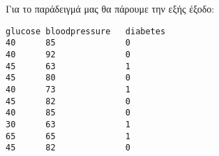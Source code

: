 Για το παράδειγμά μας θα πάρουμε την εξής έξοδο:
\begin{otherlanguage}{english}
\begin{lstlisting}[style=csvstyle, caption = output for diabetes.csv]
glucose bloodpressure   diabetes
40      85              0
40      92              0
45      63              1
45      80              0
40      73              1
45      82              0
40      85              0
30      63              1
65      65              1
45      82              0
\end{lstlisting}
\end{otherlanguage}
